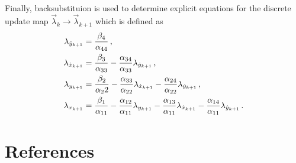 \documentclass[preprint]{elsarticle}
\begin{document}
Finally, backsubstituion is used to determine explicit equations for the discrete update map \( \vec{\lambda}_k \to \vec{\lambda}_{k+1} \) which is defined as
\begin{subequations}\label{eq:costate_update}
\begin{align}
	\lambda_{\dot{y}_{k+1}} &= \frac{\beta_4}{\alpha_{44}} \, ,\\
	\lambda_{\dot{x}_{k+1}} &= \frac{\beta_3}{\alpha_{33}} - \frac{\alpha_{34}}{\alpha_{33}} \lambda_{\dot{y}_{k+1}} \, ,\\
	\lambda_{y_{k+1}} &= \frac{\beta_2}{\alpha_22} - \frac{\alpha_{33}}{\alpha_{22}}\lambda_{\dot{x}_{k+1}} - \frac{\alpha_{24}}{\alpha_{22}} \lambda_{\dot{y}_{k+1}} \, ,\\
	\lambda_{x_{k+1}} &= \frac{\beta_1}{\alpha_{11}} - \frac{\alpha_{12}}{\alpha_{11}} \lambda_{y_{k+1}} - \frac{\alpha_{13}}{\alpha_{11}} \lambda_{\dot{x}_{k+1}} - \frac{\alpha_{14}}{\alpha_{11}} \lambda_{\dot{y}_{k+1}} \, .
\end{align}
\end{subequations}
\section*{References}



\end{document}
